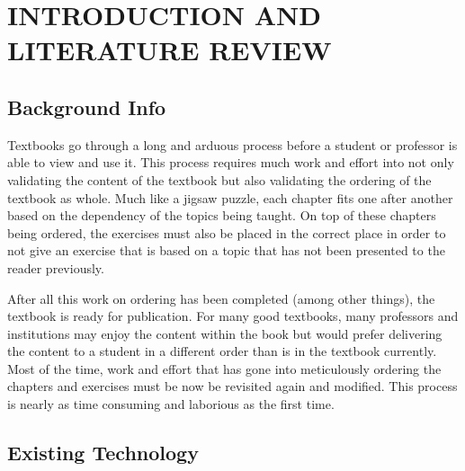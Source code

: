 %
%
%
%


\pagestyle{plain} %

\chapter{INTRODUCTION AND LITERATURE REVIEW}

\section{Background Info}

Textbooks go through a long and arduous process before a student or professor is able to view and use it. This process requires much work and effort into not only validating the content of the textbook but also validating the ordering of the textbook as whole. Much like a jigsaw puzzle, each chapter fits one after another based on the dependency of the topics being taught. On top of these chapters being ordered, the exercises must also be placed in the correct place in order to not give an exercise that is based on a topic that has not been presented to the reader previously.

After all this work on ordering has been completed (among other things), the textbook is ready for publication. For many good textbooks, many professors and institutions may enjoy the content within the book but would prefer delivering the content to a student in a different order than is in the textbook currently. Most of the time, work and effort that has gone into meticulously ordering the chapters and exercises must be now be revisited again and modified. This process is nearly as time consuming and laborious as the first time.

\section{Existing Technology}

